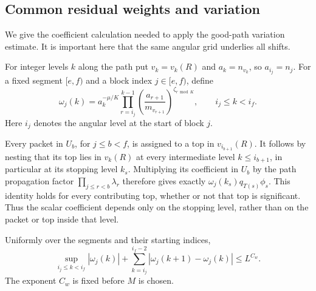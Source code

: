 \subsection{Common residual weights and variation}

We give the coefficient calculation needed to apply the good-path
variation estimate.  It is important here that the same angular
grid underlies all shifts.

For integer levels $k$ along the path put
$v_k=v_k(R)$ and $a_k=n_{v_k}$, so $a_{i_j}=n_j$.
For a fixed segment $[e,f)$ and a block index $j\in[e,f)$, define
\begin{equation}
 \omega_j(k)=a_k^{-\mu/K}
     \prod_{r=i_j}^{k-1}
       \left(\frac{a_{r+1}}{m_{v_{r+1}}}\right)^{\zeta_{r\bmod K}},
 \qquad i_j\le k<i_f.
 \label{res:common-weight}
\end{equation}
Here $i_j$ denotes the angular level at the start of block $j$.

Every packet in $U_b$, for $j\le b<f$, is assigned to a top in
$v_{i_{b+1}}(R)$.  It follows by nesting that its top lies in $v_k(R)$
at every intermediate level $k\le i_{b+1}$, in particular at its
stopping level $k_s$.  Multiplying its coefficient in $U_b$ by the
path propagation factor $\prod_{j\le r<b}\lambda_r$ therefore
gives exactly $\omega_j(k_s)q_{T(s)}\phi_s$.
This identity holds for every contributing top, whether or not that
top is significant.  Thus the scalar coefficient depends only on
the stopping level, rather than on the packet or top inside that
level.

\begin{lemma}
\label{res:common-weight-variation}
Uniformly over the segments and their starting indices,
\begin{equation}
  \sup_{i_j\le k<i_f}|\omega_j(k)|
    +\sum_{k=i_j}^{i_f-2}|\omega_j(k+1)-\omega_j(k)|
       \le L^{C_w}.
  \label{res:common-weight-BV}
\end{equation}
The exponent $C_w$ is fixed before $M$ is chosen.
\end{lemma}

